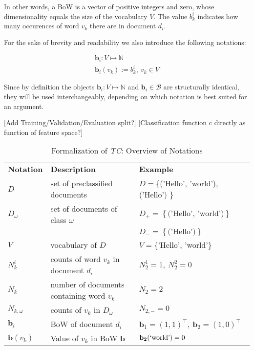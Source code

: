 In other words, a BoW is a vector of positive integers and zero, whose
dimensionality equals the size of the vocabulary $V$. The value $b_k^i$
indicates how many occurences of word $v_k$ there are in document
$d_i$. 

For the sake of brevity and readability we also introduce the following
notations:

\begin{eqnarray*}
	\mathbf{b}_i: V \mapsto \mathbb{N} \\
	\mathbf{b}_i(v_k) := b_k^i,\ v_k \in V
\end{eqnarray*}

Since by definition the objects $\mathbf{b}_i: V \mapsto \mathbb{N}$ and
$\mathbf{b}_i \in \mathcal{B}$ are structurally identical, they will be used interchangeably, 
depending on which notation is best suited for an argument. 


[Add Training/Validation/Evaluation split?]
[Classification function c directly as function of feature space?]

\begin{table}
\begin{tabular}{|l|l|l|}

\textbf{Notation} & \textbf{Description} & \textbf{Example} \\

$D$ & set of preclassified documents & $D=$\{('Hello', 'world'),
('Hello') \} \\

$D_\omega$ & set of documents of class $\omega$ & $D_+ = \left\{
\text{('Hello', 'world')} \right\}$ \\
& & $D_- = \left\{ \text{('Hello')} \right\}$ \\ 

$V$ & vocabulary of $D$ & $V=$\{'Hello', 'world'\} \\

$N_k^i$ & counts of word $v_k$ in document $d_i$ & $N_2^1 = 1,\ N_2^2 = 0$ 
\\

$N_k$ & number of documents containing word $v_k$ & $N_2 = 2$ \\

$N_{k,\omega}$ & counts of $v_k$ in $D_\omega$ & $N_{2, -} = 0$ \\ 

$\mathbf{b}_i$ & BoW of document $d_i$ & $\mathbf{b}_1 = (1, 1)^\intercal,\
\mathbf{b}_2 = (1,0)^\intercal$ \\

$\mathbf{b}(v_k)$ & Value of $v_k$ in BoW $\mathbf{b}$ &
$\mathbf{b_2}(\text{\lq world\rq}) = 0$
 
\end{tabular}
\caption{Formalization of \emph{TC}: Overview of Notations}
\label{tab:notations}
\end{table}

